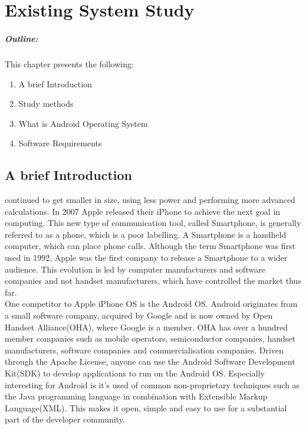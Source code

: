 \chapter{Existing System Study}
\label{chap2}


\vspace*{45 ex}



\paragraph*{Outline:} This chapter presents the following:
\begin{enumerate}
\setlength{\itemsep}{-0.3em}
\item A brief Introduction
\item Study methods 
\item What is Android Operating System
\item Software Requirements
\end{enumerate}

\newpage
\section{A brief Introduction}
continued to get smaller in	size, using	less power and performing more advanced calculations.	In 2007	Apple released their iPhone	to achieve the	next goal in computing. This new type of communication tool, called Smartphone, is	generally referred to as a phone, which is a poor labelling. A Smartphone is a handheld computer, which	can place phone	calls. Although	the	term Smartphone	was	first used in 1992, Apple was	the	first company to release a Smartphone to a wider audience. This evolution is led by computer manufacturers and software companies and not handset manufacturers, which have controlled the market thus far.\\

\noindent
One competitor to Apple iPhone OS is the Android OS. Android originates from a small software company, acquired by Google and is now owned by Open Handset Alliance(OHA), where Google is a member. OHA has over a hundred member companies such as mobile operators, semiconductor companies, handset manufacturers, software companies and commercialisation companies. Driven through the Apache License, anyone can use the Android Software Development Kit(SDK) to develop applications to run on the Android OS. Especially interesting for Android is it's used of common non-proprietary techniques such as the Java programming language in combination with Extensible Markup Language(XML). This makes it open, simple and easy to use for a substantial part of the developer community.

